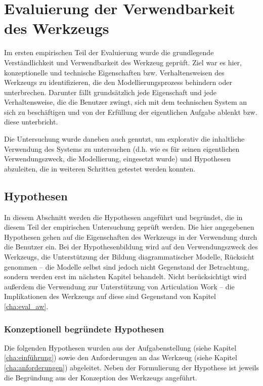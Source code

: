 \chapter{Evaluierung der Verwendbarkeit des Werkzeugs} %
\label{cha:eval_werkzeug}

Im ersten empirischen Teil der Evaluierung wurde die grundlegende Verständlichkeit und Verwendbarkeit des Werkzeug geprüft. Ziel war es hier, konzeptionelle und technische Eigenschaften bzw. Verhaltensweisen des Werkzeugs zu identifizieren, die den Modellierungsprozess behindern oder unterbrechen. Darunter fällt grundsätzlich jede Eigenschaft und jede Verhaltensweise, die die Benutzer zwingt, sich mit dem technischen System an sich zu beschäftigen und von der Erfüllung der eigentlichen Aufgabe ablenkt bzw. diese unterbricht.

Die Untersuchung wurde daneben auch genutzt, um explorativ die inhaltliche Verwendung des Systems zu untersuchen (d.h. wie es für seinen eigentlichen Verwendungszweck, die Modellierung, eingesetzt wurde) und Hypothesen abzuleiten, die in weiteren Schritten getestet werden konnten.

\section{Hypothesen} %
\label{sec:hypothesen}

In diesem Abschnitt werden die Hypothesen angeführt und begründet, die in diesem Teil der empirischen Untersuchung geprüft werden. Die hier angegebenen Hypothesen gehen auf die Eigenschaften des Werkzeugs in der Verwendung durch die Benutzer ein. Bei der Hypothesenbildung wird auf den Verwendungszweck des Werkzeugs, die Unterstützung der Bildung diagrammatischer Modelle, Rücksicht genommen -- die Modelle selbst sind jedoch nicht Gegenstand der Betrachtung, sondern werden erst im nächsten Kapitel behandelt. Nicht berücksichtigt wird außerdem die Verwendung zur Unterstützung von Articulation Work -- die Implikationen des Werkzeugs auf diese sind Gegenstand von Kapitel \ref{cha:eval_aw}.

\subsection{Konzeptionell begründete Hypothesen} %
\label{sub:konzeptionell_begründete_hypothesen}

Die folgenden Hypothesen wurden aus der Aufgabenstellung (siehe Kapitel \ref{cha:einführung}) sowie den Anforderungen an das Werkzeug (siehe Kapitel \ref{cha:anforderungen}) abgeleitet. Neben der Formulierung der Hypothese ist jeweils die Begründung aus der Konzeption des Werkzeugs angeführt.

